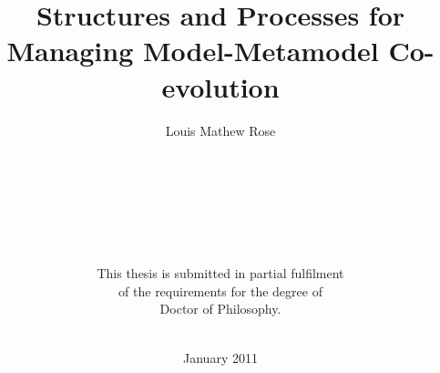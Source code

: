 \title{Structures and Processes for Managing Model-Metamodel Co-evolution}
\author{Louis Mathew Rose \\ \\
\\ \\ \\ \\ \\ \\
This thesis is submitted in partial fulfilment \\
of the requirements for the degree of \\
Doctor of Philosophy. \\ \\}
\date{January 2011}